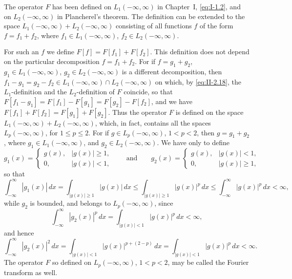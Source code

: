 \begin{remark}
The operator $F$ has been defined on $L_{1}(-\infty,\infty)$ in Chapter~I, \eqref{eq:I-1.2}, and on $L_{2}(-\infty,\infty)$ in Plancherel's theorem. The definition can be extended to the space $L_{1}(-\infty,\infty)+L_{2}(-\infty,\infty)$ consisting of all functions $f$ of the form $f=f_{1}+f_{2}$, where $f_{1}\in L_{1}(-\infty,\infty)$, $f_{2}\in L_{2}(-\infty,\infty)$.

For such an $f$ we define $F[f]=F[f_{1}]+F[f_{2}]$. This definition does not depend on the particular decomposition $f=f_{1}+f_{2}$. For if $f=g_{1}+g_{2}$, $g_{1}\in L_{1}(-\infty,\infty)$, $g_{2}\in L_{2}(-\infty,\infty)$ is a different decomposition, then $f_{1}-g_{1}=g_{2}-f_{2}\in L_{1}(-\infty,\infty)\cap L_{2}(-\infty,\infty)$ on which, by \eqref{eq:II-2.18}, the $L_{1}$-definition and the $L_{2}$-definition of $F$ coincide, so that $F[f_{1}-g_{1}]=F[f_{1}]-F[g_{1}]=F[g_{2}]-F[f_{2}]$, and we have $F[f_{1}]+F[f_{2}]=F[g_{1}]+F[g_{2}]$. Thus the operator $F$ is defined on the space $L_{1}(-\infty,\infty)+L_{2}(-\infty,\infty)$, which, in fact, contains all the spaces $L_{p}(-\infty,\infty)$, for $1\le p\le 2$. For if $g\in L_{p}(-\infty,\infty)$, $1<p<2$, then $g=g_{1}+g_{2}$, where $g_{1}\in L_{1}(-\infty,\infty)$, and $g_{2}\in L_{2}(-\infty,\infty)$. We have only to define
\[
g_{1}(x)=
\begin{cases}
g(x), & |g(x)|\ge 1,\\
0, & |g(x)|<1,
\end{cases}
\qquad\text{and}\qquad
g_{2}(x)=
\begin{cases}
g(x), & |g(x)|<1,\\
0, & |g(x)|\ge 1,
\end{cases}
\]
so that
\[
\int_{-\infty}^{\infty}|g_{1}(x)|\,dx
=\int_{|g(x)|\ge 1}|g(x)|\,dx
\le\int_{|g(x)|\ge 1}|g(x)|^{p}\,dx
\le\int_{-\infty}^{\infty}|g(x)|^{p}\,dx<\infty,
\]
while $g_{2}$ is bounded, and belongs to $L_{p}(-\infty,\infty)$, since
\[
\int_{-\infty}^{\infty}|g_{2}(x)|^{p}\,dx
=\int_{|g(x)|<1}|g(x)|^{p}\,dx<\infty,
\]
and hence
\[
\int_{-\infty}^{\infty}|g_{2}(x)|^{2}\,dx
=\int_{|g(x)|<1}|g(x)|^{p+(2-p)}\,dx
=\int_{|g(x)|<1}|g(x)|^{p}\,dx<\infty.
\]
The operator $F$ so defined on $L_{p}(-\infty,\infty)$, $1<p<2$, may be called the Fourier transform as well.
\end{remark}

